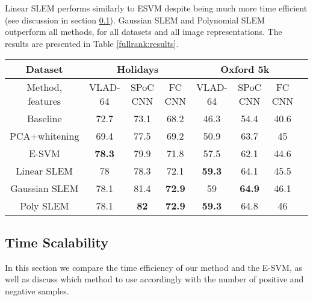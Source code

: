 Linear SLEM performs similarly to ESVM despite being much more time efficient (see discussion in section \ref{time-scale}).
Gaussian SLEM and Polynomial SLEM outperform all methods, for all datasets and all image representations.
The results are presented in Table \ref{fullrank:results}.

\begin{table*}[t]
\begin{center}
\caption{Mean average precision results for INRIA Holidays and Oxford buildings datasets, expressed as percentages. In this table, we present our results for VLAD-64 \ref{VLAD}, sum-pooling of convolutional features (SPoC) \ref{babenko15} and fully connected (fc) CNN \ref{jia2014caffe}}
\begin{tabular}{|c|c|c|c|c|c|c|c|}
\hline
Dataset & \multicolumn{3}{|c|}{\textbf{Holidays}} & \multicolumn{3}{|c|}{\textbf{Oxford 5k}}\\
\hline
Method, features & VLAD-64  & SPoC CNN & FC CNN & VLAD-64 & SPoC CNN & FC CNN\\
\hline\hline
Baseline            & 72.7         & 73.1         & 68.2         & 46.3           & 54.4         & 40.6\\
PCA+whitening       & 69.4         & 77.5         & 69.2         & 50.9           & 63.7         & 45 \\
E-SVM               & \textbf{78.3} & 79.9         & 71.8         & 57.5           & 62.1         & 44.6\\
Linear SLEM         & 78           & 78.3         & 72.1         & \textbf{59.3}   & 64.1         & 45.5\\
Gaussian SLEM       & 78.1         & 81.4         & \textbf{72.9} & 59             & \textbf{64.9} & 46.1\\
Poly SLEM           & 78.1         & \textbf{82}   & \textbf{72.9} & \textbf{59.3}  & 64.8         & 46\\
\hline
\end{tabular}
\end{center}
\label{fullrank:results}
\end{table*}


\subsection{Time Scalability} \label{time-scale}
In this section we compare the time efficiency of our method and the E-SVM, as well as discuss which method to use accordingly with the number of positive and negative samples.

